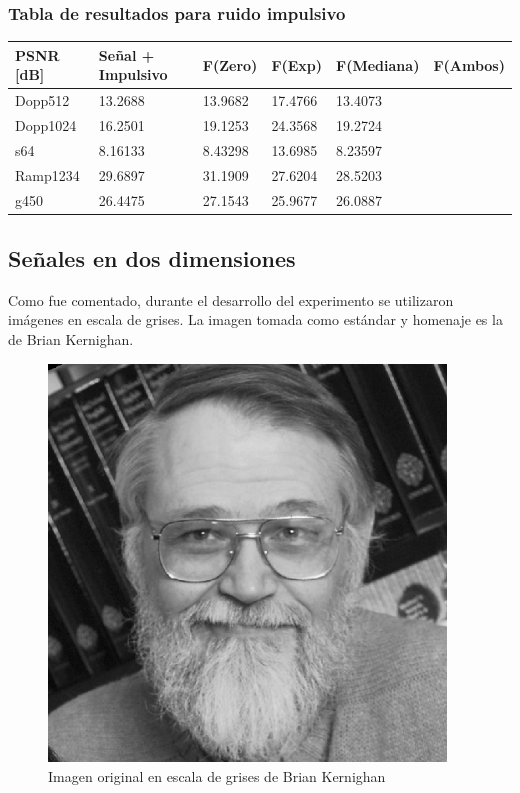 \subsubsection{Tabla de resultados para ruido impulsivo}

\begin{table}[H]
        \begin{tabular}{|l|lllll|}
                \hline
                \textbf{PSNR [dB]} & Se\~nal + Impulsivo  & F(Zero) & F(Exp) & F(Mediana) & F(Ambos) \\ \hline
                    Dopp512 & 13.2688 & 13.9682 & 17.4766 & 13.4073 \\
                    Dopp1024 & 16.2501 & 19.1253 & 24.3568 & 19.2724 \\
                    s64 & 8.16133 & 8.43298 & 13.6985 & 8.23597  \\
                    Ramp1234 & 29.6897 & 31.1909 & 27.6204 & 28.5203 \\
                    g450 & 26.4475 & 27.1543 & 25.9677 & 26.0887  \\ \hline
                    \end{tabular}
                \end{table}


\newpage

        \subsection{Se\~nales en dos dimensiones}

Como fue comentado, durante el desarrollo del experimento se utilizaron
im\'agenes en escala de grises. La imagen tomada como est\'andar y homenaje es 
la de Brian Kernighan.

\begin{figure}[H]
\begin {center}
\includegraphics[width=299pt]{imagenes/brian_kernighan.png}
\end {center}
\caption{Imagen original en escala de grises de Brian Kernighan}
\label{fig:SinProm}
\end{figure}

